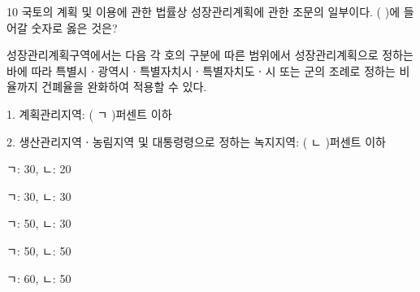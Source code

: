 \begin{question}{10}
국토의 계획 및 이용에 관한 법률상 성장관리계획에 관한 조문의 일부이다. ( )에 들어갈 숫자로 옳은 것은?
\begin{framedtext}
성장관리계획구역에서는 다음 각 호의 구분에 따른 범위에서 성장관리계획으로 정하는 바에 따라 특별시ㆍ광역시ㆍ특별자치시ㆍ특별자치도ㆍ시 또는 군의 조례로 정하는 비율까지 건폐율을 완화하여 적용할 수 있다. \par
1. 계획관리지역: ( ㄱ )퍼센트 이하 \par
2. 생산관리지역ㆍ농림지역 및 대통령령으로 정하는 녹지지역: ( ㄴ )퍼센트 이하
\end{framedtext}
\begin{choices}
  \item ㄱ: 30, ㄴ: 20
  \item ㄱ: 30, ㄴ: 30
  \item ㄱ: 50, ㄴ: 30
  \item ㄱ: 50, ㄴ: 50
  \item ㄱ: 60, ㄴ: 50
\end{choices}
\end{question}
